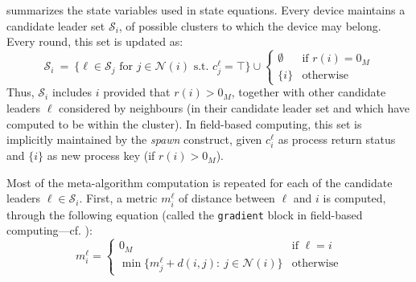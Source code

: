  summarizes the state variables used in state equations.
 Every device maintains a candidate leader set $\mathcal{S}_i$, of possible clusters to which the device may belong. Every round, this set is updated as:
\[
\mathcal{S}_i ~=~ \{ \ell \in \mathcal{S}_j \text{ for } j \in \mathcal{N}(i) \text{ s.t. } c^\ell_j = \top \} \cup \begin{cases}
	\emptyset & \text{if } r(i) = 0_M \\
	\{ i \} & \text{otherwise}
\end{cases}
\]
Thus, $\mathcal{S}_i$ includes $i$ provided that $r(i) > 0_M$, together with other candidate leaders $\ell$ considered by neighbours
 (in their candidate leader set and which have computed to be within the cluster).
 In field-based computing, this set is implicitly maintained by the \emph{spawn} construct,
 given $c^\ell_i$ as process return status and $\{ i \}$ as new process key (if $r(i) > 0_M$).

Most of the meta-algorithm computation is repeated for each of the candidate leaders $\ell \in \mathcal{S}_i$. First, a metric $m^\ell_i$ of distance between $\ell$ and $i$ is computed,
 through the following equation (called the \lstinline|gradient| block in field-based computing---cf. ):
\[
m^\ell_i = \begin{cases}
	0_M & \text{if } \ell = i \\
	\min \{m^\ell_j + d(i,j) : ~ j \in \mathcal{N}(i) \} & \text{otherwise}
\end{cases}
\]

